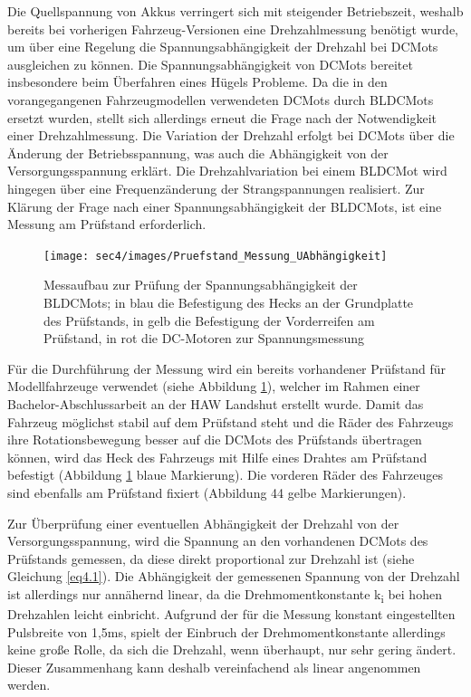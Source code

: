 Die Quellspannung von Akkus verringert sich mit steigender Betriebszeit, weshalb bereits bei vorherigen Fahrzeug-Versionen eine Drehzahlmessung benötigt wurde, um über eine Regelung die Spannungsabhängigkeit der Drehzahl bei \acp{DCMot} ausgleichen zu können. Die Spannungsabhängigkeit von \acp{DCMot} bereitet insbesondere beim Überfahren eines Hügels Probleme. Da die in den vorangegangenen Fahrzeugmodellen verwendeten \acp{DCMot} durch \acp{BLDCMot} ersetzt wurden, stellt sich allerdings erneut die Frage nach der Notwendigkeit einer Drehzahlmessung. Die Variation der Drehzahl erfolgt bei \acp{DCMot} über die Änderung der Betriebsspannung, was auch die Abhängigkeit von der Versorgungsspannung erklärt. Die Drehzahlvariation bei einem \ac{BLDCMot} wird hingegen über eine Frequenzänderung der Strangspannungen realisiert. Zur Klärung der Frage nach einer Spannungsabhängigkeit der \acp{BLDCMot}, ist eine Messung am Prüfstand erforderlich.

\begin{figure}[H] %
\texttt{[image: sec4/images/Pruefstand\_Messung\_UAbhängigkeit]} 
\centering
\captionsetup{width=.95\textwidth}
\caption[Messaufbau zur Prüfung der Spannungsabhängigkeit der \acp{BLDCMot}]{Messaufbau zur Prüfung der Spannungsabhängigkeit der \acp{BLDCMot}; in blau die Befestigung des Hecks an der Grundplatte des Prüfstands, in gelb die Befestigung der Vorderreifen am Prüfstand, in rot die DC-Motoren zur Spannungsmessung}\centering
\label{fig:Pruefstand01}
\end{figure}

Für die Durchführung der Messung wird ein bereits vorhandener Prüfstand für Modellfahrzeuge verwendet (siehe Abbildung \ref{fig:Pruefstand01}), welcher im Rahmen einer Bachelor-Abschlussarbeit an der HAW Landshut erstellt wurde. Damit das Fahrzeug möglichst stabil auf dem Prüfstand steht und die Räder des Fahrzeugs ihre Rotationsbewegung besser auf die \acp{DCMot} des Prüfstands übertragen können, wird das Heck des Fahrzeugs mit Hilfe eines Drahtes am Prüfstand befestigt (Abbildung \ref{fig:Pruefstand01} blaue Markierung). Die vorderen Räder des Fahrzeuges sind ebenfalls am Prüfstand fixiert (Abbildung 44 gelbe Markierungen). \vspace{11pt}

Zur Überprüfung einer eventuellen Abhängigkeit der Drehzahl von der Versorgungsspannung, wird die Spannung an den vorhandenen \acp{DCMot} des Prüfstands gemessen, da diese direkt proportional zur Drehzahl ist (siehe Gleichung \ref{eq4.1}). Die Abhängigkeit der gemessenen Spannung von der Drehzahl ist allerdings nur annähernd linear, da die Drehmomentkonstante k\textsubscript{i} bei hohen Drehzahlen leicht einbricht. Aufgrund der für die Messung konstant eingestellten Pulsbreite von 1,5ms, spielt der Einbruch der Drehmomentkonstante allerdings keine große Rolle, da sich die Drehzahl, wenn überhaupt, nur sehr gering ändert. Dieser Zusammenhang kann deshalb vereinfachend als linear angenommen werden.\vspace{11pt}

